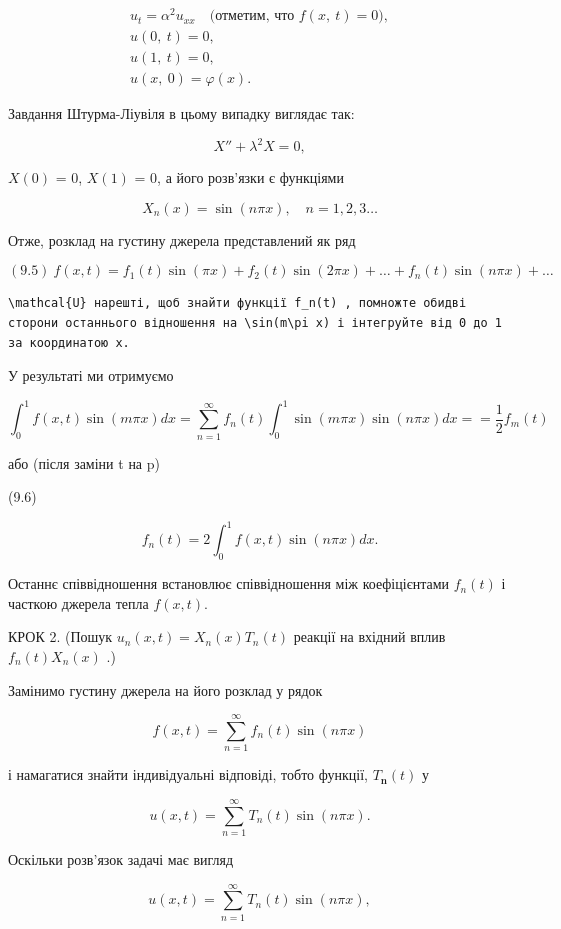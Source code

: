 \documentclass[
  ukrainian,
]{article}
\begin{document}
\[
\begin{array}{c} u_t = \alpha^2 u_{xx} \quad \text{(отметим, что } f(x, \ t) = 0), \\ u(0, \ t) = 0, \\ u(1, \ t) = 0, \\ u(x, \ 0) = \varphi(x). \end{array}
\]

Завдання Штурма-Ліувіля в цьому випадку виглядає так:

\[
X'' + \lambda^2 X = 0,
\]

\(X(0)\) = 0, \(X(1)\) = 0, а його розв'язки є функціями

\[
X_n(x) = \sin(n\pi x), \quad n = 1, 2, 3 \dots
\]

Отже, розклад на густину джерела представлений як ряд

\[
(9.5) \ f(x,t) = f_1(t) \sin(\pi x) + f_2(t) \sin(2\pi x) + \dots + f_n(t) \sin(n\pi x) + \dots
\]

\begin{verbatim}
\mathcal{U} нарешті, щоб знайти функції f_n(t) , помножте обидві сторони останнього відношення на \sin(m\pi x) і інтегруйте від 0 до 1 за координатою x.
\end{verbatim}

У результаті ми отримуємо

\[
\int_{0}^{1} f(x, t) \sin(m\pi x) dx = \sum_{n=1}^{\infty} f_{n}(t) \int_{0}^{1} \sin(m\pi x) \sin(n\pi x) dx =
= \frac{1}{2} f_{m}(t)
\]

або (після заміни t на p)

(9.6)

\[
f_{n}(t) = 2 \int_{0}^{1} f(x, t) \sin(n\pi x) dx.
\]

Останнє співвідношення встановлює співвідношення між коефіцієнтами
\(f_n(t)\) і часткою джерела тепла \(f(x, t)\).

КРОК 2. (Пошук \(u_n(x, t) = X_n(x) T_n(t)\) реакції на вхідний вплив
\(f_n(t) X_n(x)\) .)

Замінимо густину джерела на його розклад у рядок

\[
f(x, t) = \sum_{n=1}^{\infty} f_n(t) \sin(n\pi x)
\]

і намагатися знайти індивідуальні відповіді, тобто функції,
\(T_{\mathbf{n}}(t)\) у

\[
u(x, t) = \sum_{n=1}^{\infty} T_n(t) \sin(n\pi x).
\]

Оскільки розв'язок задачі має вигляд

\[
u(x, t) = \sum_{n=1}^{\infty} T_n(t) \sin(n\pi x),
\]
\end{document}

